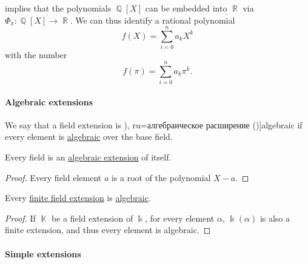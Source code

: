 \begin{example}\label{ex:polynomials_over_pi}
   implies that the polynomials \( \BbbQ[X] \) can be embedded into \( \BbbR \) via \( \Phi_\pi: \BbbQ[X] \to \BbbR \). We can thus identify a rational polynomial
  \begin{equation*}
    f(X) = \sum_{i=0}^n a_k X^k
  \end{equation*}
  with the number
  \begin{equation*}
    f(\pi) = \sum_{i=0}^n a_k \pi^k.
  \end{equation*}
\end{example}

\paragraph{Algebraic extensions}

\begin{definition}\label{def:algebraic_extension}
  We say that a field extension is \term[bg=алгебрично разширение (\cite[201]{ГеновМиховскиМоллов1991Алгебра}), ru=алгебраическое расширение (\cite[408]{Винберг2014КурсАлгебры})]{algebraic} if every element is \hyperref[def:algebraic_element]{algebraic} over the base field.
\end{definition}

\begin{proposition}\label{thm:field_is_algebraic_over_itself}
  Every field is an \hyperref[def:algebraic_extension]{algebraic extension} of itself.
\end{proposition}
\begin{proof}
  Every field element \( a \) is a root of the polynomial \( X - a \).
\end{proof}

\begin{proposition}\label{thm:finite_field_extensions_are_algebraic}
  Every \hyperref[def:field_extension_degree]{finite field extension} is \hyperref[def:algebraic_extension]{algebraic}.
\end{proposition}
\begin{proof}
  If \( \BbbK \) be a field extension of \( \Bbbk \), for every element \( \alpha \), \( \Bbbk(\alpha) \) is also a finite extension, and thus every element is algebraic.
\end{proof}

\paragraph{Simple extensions}

